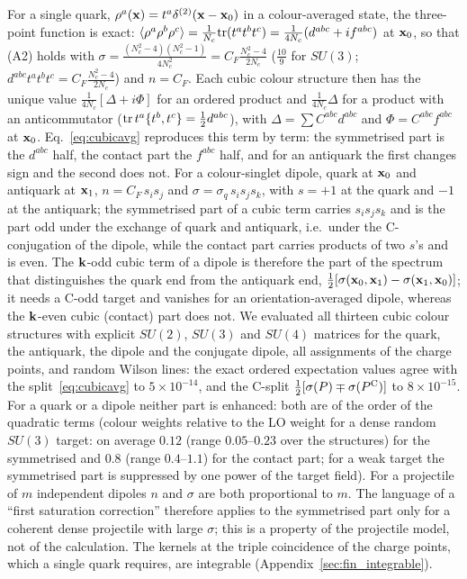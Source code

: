 For a single quark, $\rho^a(\mathbf{x})=t^a\delta^{(2)}(\mathbf{x}-\mathbf{x}_0)$ in a colour-averaged state, the three-point function is exact: $\langle\rho^a\rho^b\rho^c\rangle=\frac1{N_c}{\rm tr}(t^at^bt^c)=\frac{1}{4N_c}(d^{abc}+if^{abc})$ at $\mathbf{x}_0$, so that (A2) holds with $\sigma=\frac{(N_c^2-4)(N_c^2-1)}{4N_c^2}=C_F\frac{N_c^2-4}{2N_c}$ ($\frac{10}{9}$ for $SU(3)$; $d^{abc}t^at^bt^c=C_F\frac{N_c^2-4}{2N_c}$) and $n=C_F$. Each cubic colour structure then has the unique value $\frac{1}{4N_c}[\Delta+i\Phi]$ for an ordered product and $\frac{1}{4N_c}\Delta$ for a product with an anticommutator (${\rm tr}\,t^a\{t^b,t^c\}=\frac12d^{abc}$), with $\Delta=\sum C^{abc}d^{abc}$ and $\Phi=C^{abc}f^{abc}$ at $\mathbf{x}_0$. Eq.~\eqref{eq:cubicavg} reproduces this term by term: the symmetrised part is the $d^{abc}$ half, the contact part the $f^{abc}$ half, and for an antiquark the first changes sign and the second does not. For a colour-singlet dipole, quark at $\mathbf{x}_0$ and antiquark at $\mathbf{x}_1$, $n=C_F\,s_is_j$ and $\sigma=\sigma_q\,s_is_js_k$, with $s=+1$ at the quark and $-1$ at the antiquark; the symmetrised part of a cubic term carries $s_is_js_k$ and is the part odd under the exchange of quark and antiquark, i.e.\ under the C-conjugation of the dipole, while the contact part carries products of two $s$'s and is even. The $\mathbf{k}$-odd cubic term of a dipole is therefore the part of the spectrum that distinguishes the quark end from the antiquark end, $\frac12[\sigma(\mathbf{x}_0,\mathbf{x}_1)-\sigma(\mathbf{x}_1,\mathbf{x}_0)]$; it needs a C-odd target and vanishes for an orientation-averaged dipole, whereas the $\mathbf{k}$-even cubic (contact) part does not. We evaluated all thirteen cubic colour structures with explicit $SU(2)$, $SU(3)$ and $SU(4)$ matrices for the quark, the antiquark, the dipole and the conjugate dipole, all assignments of the charge points, and random Wilson lines: the exact ordered expectation values agree with the split~\eqref{eq:cubicavg} to $5\times10^{-14}$, and the C-split $\frac12[\sigma(P)\mp\sigma(P^{\rm C})]$ to $8\times10^{-15}$. For a quark or a dipole neither part is enhanced: both are of the order of the quadratic terms (colour weights relative to the LO weight for a dense random $SU(3)$ target: on average $0.12$ (range $0.05$--$0.23$ over the structures) for the symmetrised and $0.8$ (range $0.4$--$1.1$) for the contact part; for a weak target the symmetrised part is suppressed by one power of the target field). For a projectile of $m$ independent dipoles $n$ and $\sigma$ are both proportional to $m$. The language of a ``first saturation correction'' therefore applies to the symmetrised part only for a coherent dense projectile with large $\sigma$; this is a property of the projectile model, not of the calculation. The kernels at the triple coincidence of the charge points, which a single quark requires, are integrable (Appendix~\ref{sec:fin_integrable}).

